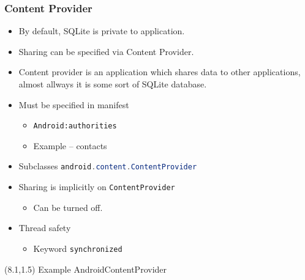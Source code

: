 \documentclass[10pt,xcolor=pdflatex]{beamer}
\newcommand{\inlinejava}{\lstinline[language={Java},basicstyle=\ttfamily,keepspaces]}
\begin{document}
\begin{frame}[fragile]\frametitle{Content Provider}
\begin{itemize}
	\item By default, SQLite is private to application.
	\item Sharing can be specified via Content Provider.
	\item Content provider is an application which shares data to other applications, almost allways it is some sort of SQLite database.
	\item Must be specified in manifest
      \begin{itemize}
    	\item \texttt{Android:authorities}
		\item Example -- contacts
      \end{itemize}
    \item Subclasses {\color{red}\inlinejava{android.content.ContentProvider}}
    \item Sharing is implicitly on \texttt{ContentProvider}
      \begin{itemize}
    	\item Can be turned off.
      \end{itemize}
    \item Thread safety
      \begin{itemize}
    	\item Keyword \texttt{synchronized}
      \end{itemize}
\end{itemize}
\begin{textblock}{15}(8.1,1.5)
    {\footnotesize Example AndroidContentProvider}
\end{textblock}
\end{frame}
\end{document}
